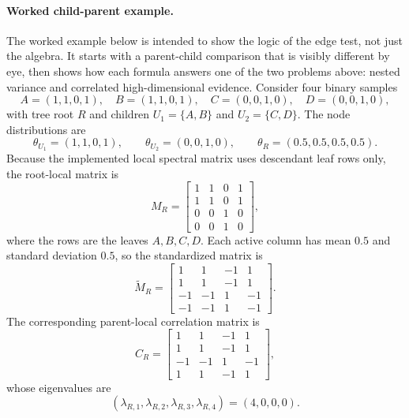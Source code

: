 \paragraph{Worked child-parent example.}
The worked example below is intended to show the logic of the edge test, not
just the algebra. It starts with a parent-child comparison that is visibly
different by eye, then shows how each formula answers one of the two problems
above: nested variance and correlated high-dimensional evidence. Consider four
binary samples
\begin{equation}
A=(1,1,0,1),\quad
B=(1,1,0,1),\quad
C=(0,0,1,0),\quad
D=(0,0,1,0),
\end{equation}
with tree root $R$ and children $U_1=\{A,B\}$ and $U_2=\{C,D\}$. The node
distributions are
\begin{equation}
\theta_{U_1}=(1,1,0,1),\qquad
\theta_{U_2}=(0,0,1,0),\qquad
\theta_R=(0.5,0.5,0.5,0.5).
\end{equation}
Because the implemented local spectral matrix uses descendant leaf rows only,
the root-local matrix is
\begin{equation}
M_R =
\begin{bmatrix}
1&1&0&1\\
1&1&0&1\\
0&0&1&0\\
0&0&1&0
\end{bmatrix},
\end{equation}
where the rows are the leaves $A,B,C,D$. Each active column has mean $0.5$ and
standard deviation $0.5$, so the standardized matrix is
\begin{equation}
\widetilde{M}_R =
\begin{bmatrix}
1&1&-1&1\\
1&1&-1&1\\
-1&-1&1&-1\\
-1&-1&1&-1
\end{bmatrix}.
\end{equation}
The corresponding parent-local correlation matrix is
\begin{equation}
C_R =
\begin{bmatrix}
1&1&-1&1\\
1&1&-1&1\\
-1&-1&1&-1\\
1&1&-1&1
\end{bmatrix},
\end{equation}
whose eigenvalues are
\begin{equation}
(\lambda_{R,1},\lambda_{R,2},\lambda_{R,3},\lambda_{R,4}) = (4,0,0,0).
\end{equation}
